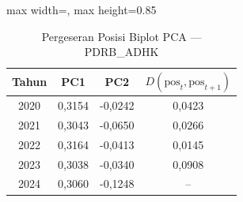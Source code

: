 \begin{table}[H]
\centering
\caption{Pergeseran Posisi Biplot PCA --- PDRB\_ADHK} \label{tab:appjarak_pca_loading_pdrb_adhk}
\begin{adjustbox}{max width=\textwidth, max height=0.85\textheight}
\begin{tabular}{|c|c|c|c|}
\hline
\textbf{Tahun} & \textbf{PC1} & \textbf{PC2} & \textbf{$D(\text{pos}_t, \text{pos}_{t+1})$} \\
\hline
2020 & 0,3154 & -0,0242 & 0,0423 \\
2021 & 0,3043 & -0,0650 & 0,0266 \\
2022 & 0,3164 & -0,0413 & 0,0145 \\
2023 & 0,3038 & -0,0340 & 0,0908 \\
2024 & 0,3060 & -0,1248 & -- \\
\hline
\end{tabular}
\end{adjustbox}
\end{table}